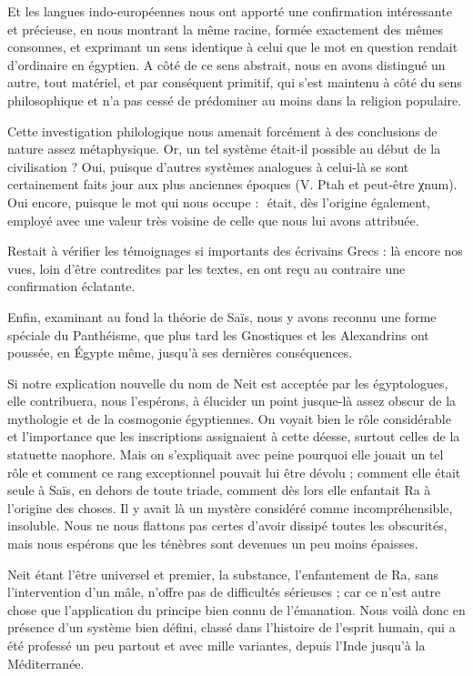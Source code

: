 \documentclass[letterpaper,twocolumn,openany,nodeprecatedcode]{dndbook}
\newcommand*\hieroAAAQ{}
\begin{document}
Et les langues indo-européennes nous ont apporté une confirmation intéressante et précieuse, en nous montrant la même racine, formée exactement des mêmes consonnes, et exprimant un sens identique à celui que le mot en question rendait d'ordinaire en égyptien. A côté de ce sens abstrait, nous en avons distingué un autre, tout matériel, et par conséquent primitif, qui s'est maintenu à côté du sens philosophique et n'a pas cessé de prédominer au moins dans la religion populaire.

Cette investigation philologique nous amenait forcément à des conclusions de nature assez métaphysique. Or, un tel système était-il possible au début de la civilisation ? Oui, puisque d'autres systèmes analogues à celui-là se sont certainement faits jour aux plus anciennes époques (V. Ptah et peut-être χnum). Oui encore, puisque le mot qui nous occupe : $\hieroAAAQ$ était, dès l'origine également, employé avec une valeur très voisine de celle que nous lui avons attribuée.

Restait à vérifier les témoignages si importants des écrivains Grecs : là encore nos vues, loin d'être contredites par les textes, en ont reçu au contraire une confirmation éclatante.

Enfin, examinant au fond la théorie de Saïs, nous y avons reconnu une forme spéciale du Panthéisme, que plus tard les Gnostiques et les Alexandrins ont poussée, en Égypte même, jusqu'à ses dernières conséquences.

Si notre explication nouvelle du nom de Neit est acceptée par les égyptologues, elle contribuera, nous l'espérons, à élucider un point jusque-là assez obscur de la mythologie et de la cosmogonie égyptiennes. On voyait bien le rôle considérable et l'importance que les inscriptions assignaient à cette déesse, surtout celles de la statuette naophore. Mais on s'expliquait avec peine pourquoi elle jouait un tel rôle et comment ce rang exceptionnel pouvait lui être dévolu ; comment elle était seule à Saïs, en dehors de toute triade, comment dès lors elle enfantait Ra à l'origine des choses. Il y avait là un mystère considéré comme incompréhensible, insoluble. Nous ne nous flattons pas certes d'avoir dissipé toutes les obscurités, mais nous espérons que les ténèbres sont devenues un peu moins épaisses.

Neit étant l'être universel et premier, la substance, l'enfantement de Ra, sans l'intervention d'un mâle, n'offre pas de difficultés sérieuses ; car ce n'est autre chose que l'application du principe bien connu de l'émanation. Nous voilà donc en présence d'un système bien défini, classé dans l'histoire de l'esprit humain, qui a été professé un peu partout et avec mille variantes, depuis l'Inde jusqu'à la Méditerranée.
\end{document}

